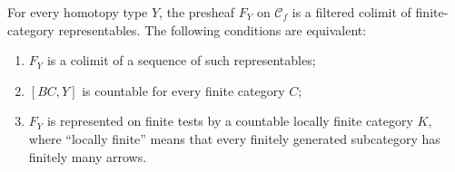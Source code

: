 \begin{proposition}
\label{CD:sequential}
For every homotopy type $Y$, the presheaf $F_Y$ on $\mathcal C_f$ is a
filtered colimit of finite-category representables.  The following
conditions are equivalent:
\begin{enumerate}[label=(\roman*)]
\item $F_Y$ is a colimit of a sequence of such representables;
\item $[BC,Y]$ is countable for every finite category $C$;
\item $F_Y$ is represented on finite tests by a countable locally finite
category $K$, where ``locally finite'' means that every finitely generated
subcategory has finitely many arrows.
\end{enumerate}
\end{proposition}
